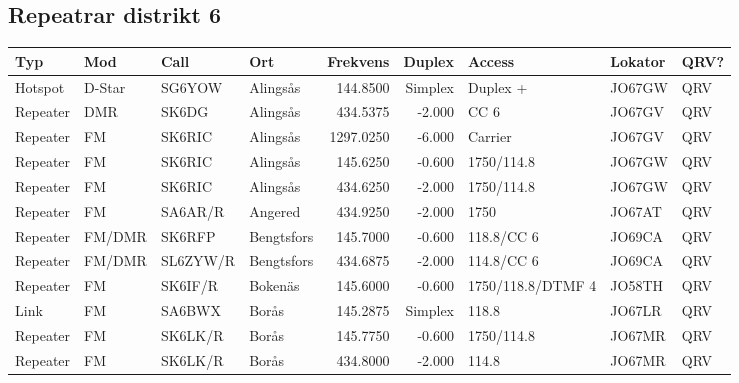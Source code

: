 \begin{landscape}
\clearpage

\subsection{Repeatrar distrikt 6}

\begin{longtable}{llllrrlll}
	\bf Typ  & \bf Mod         & \bf Call & \bf Ort               & \bf Frekvens & \bf Duplex & \bf Access        & \bf Lokator & \bf QRV? \\ \hline
	\endhead
	Hotspot  & D-Star          & SG6YOW   & Alingsås              &     144.8500 &    Simplex & Duplex +          & JO67GW      & QRV      \\
	Repeater & DMR             & SK6DG    & Alingsås              &     434.5375 &     -2.000 & CC 6              & JO67GV      & QRV      \\
	Repeater & FM              & SK6RIC   & Alingsås              &    1297.0250 &     -6.000 & Carrier           & JO67GV      & QRV      \\
	Repeater & FM              & SK6RIC   & Alingsås              &     145.6250 &     -0.600 & 1750/114.8        & JO67GW      & QRV      \\
	Repeater & FM              & SK6RIC   & Alingsås              &     434.6250 &     -2.000 & 1750/114.8        & JO67GW      & QRV      \\
	Repeater & FM              & SA6AR/R  & Angered               &     434.9250 &     -2.000 & 1750              & JO67AT      & QRV      \\
	Repeater & FM/DMR          & SK6RFP   & Bengtsfors            &     145.7000 &     -0.600 & 118.8/CC 6        & JO69CA      & QRV      \\
	Repeater & FM/DMR          & SL6ZYW/R & Bengtsfors            &     434.6875 &     -2.000 & 114.8/CC 6        & JO69CA      & QRV      \\
	Repeater & FM              & SK6IF/R  & Bokenäs               &     145.6000 &     -0.600 & 1750/118.8/DTMF 4 & JO58TH      & QRV      \\
	Link     & FM              & SA6BWX   & Borås                 &     145.2875 &    Simplex & 118.8             & JO67LR      & QRV      \\
	Repeater & FM              & SK6LK/R  & Borås                 &     145.7750 &     -0.600 & 1750/114.8        & JO67MR      & QRV      \\
	Repeater & FM              & SK6LK/R  & Borås                 &     434.8000 &     -2.000 & 114.8             & JO67MR      & QRV      \\

\end{longtable}
\end{landscape}
